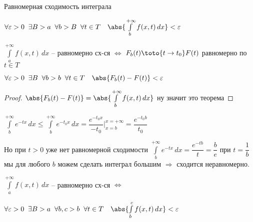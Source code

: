 
\begin{definition}
	Равномерная сходимость интеграла
	
	$\forall \varepsilon > 0 \;\; \exists B > a \;\; \forall b > B \;\; \forall t \in T \quad \abs{\int\limits_b^{+\infty} f(x, t)\, dx} < \varepsilon$
	
\end{definition}

\begin{remark}\thmslashn
	
	$\int\limits_a^{+\infty} f(x, t)\, dx$  -- равномерно сх-ся $\Leftrightarrow$ $F_b(t)  \toto{t\to t_0} F(t)$ равномерно по $t \in T$
	
	$\forall \varepsilon > 0\;\; \exists B \;\; \forall b > b \;\; \forall t\in T \quad \abs{F_b(t) - F(t)} < \varepsilon$
	
\end{remark}

\begin{proof}\thmslashn
	
	$\abs{F_b(t) - F(t)} = \abs{\int\limits_b^{+\infty} f(x, t)\, dx}$	ну значит это теорема

\end{proof}

\begin{example}\thmslashn
	
	$\int\limits_b^{+\infty} e^{-tx}\, dx \leqslant \int\limits_b^{+\infty} e^{-t_0x}\, dx  = \dfrac{e^{-t_0x}}{-t_0}\Big|_{x = b}^{x = +\infty} = \dfrac{e^{-t_0b}}{t_0}$

	Но при $t > 0$	уже нет равномерной сходимости $\int\limits_b^{+\infty} e^{-tx}\, dx = \dfrac{e^{-tb}}{t} = \dfrac{b}{e}$ при $t = \dfrac{1}{b}$ мы для любого $b$ можем сделать интеграл большим $\Rightarrow$ сходится неравномерно.
\end{example}

\begin{theorem}\thmslashn
	
	$\int\limits_a^{+\infty} f(x, t)\, dx$  -- равномерно сх-ся $\Leftrightarrow$ 
	
	$\forall \varepsilon > 0\;\; \exists B > a\;\; \forall b, c > b\;\; \forall t \in T \quad \abs{\int\limits_{b}^{c}f(x, t)\,dx} < \varepsilon$
	
\end{theorem}

